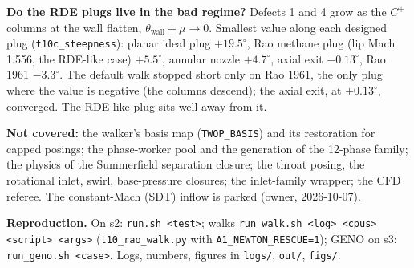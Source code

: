\textbf{Do the RDE plugs live in the bad regime?} Defects 1 and 4 grow as the $C^+$ columns at the wall flatten,
$\theta_\mathrm{wall}+\mu\to0$. Smallest value along each designed plug (\texttt{t10c\_steepness}): planar ideal plug
$+19.5^\circ$, Rao methane plug (lip Mach 1.556, the RDE-like case) $+5.5^\circ$, annular nozzle $+4.7^\circ$, axial exit
$+0.13^\circ$, Rao 1961 $-3.3^\circ$. The default walk stopped short only on Rao 1961, the only plug where the value
is negative (the columns descend); the axial exit, at $+0.13^\circ$, converged. The RDE-like plug sits well away from it.

\textbf{Not covered:} the walker's basis map (\texttt{TWOP\_BASIS}) and its restoration for capped posings; the
phase-worker pool and the generation of the 12-phase family; the physics of the
Summerfield separation closure; the throat posing, the rotational inlet, swirl, base-pressure closures; the inlet-family
wrapper; the CFD referee. The constant-Mach (SDT) inflow is parked (owner, 2026-10-07).

{\sloppy\textbf{Reproduction.} On s2: \texttt{run.sh <test>}; walks \texttt{run\_walk.sh <log> <cpus> <script> <args>}
(\texttt{t10\_rao\_walk.py} with \texttt{A1\_NEWTON\_RESCUE=1}); GENO on s3: \texttt{run\_geno.sh <case>}. Logs, numbers,
figures in \texttt{logs/}, \texttt{out/}, \texttt{figs/}.\par}
